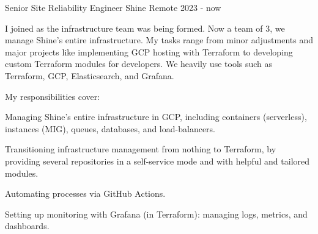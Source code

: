


\begin{cventries}

\cventry
{Senior Site Reliability Engineer} %
{Shine} %
{Remote} %
{2023 - now} %
{ %
\begin{cvitems}
\item {I joined as the infrastructure team was being formed. Now a team of 3, we manage Shine's entire infrastructure. My tasks range from minor adjustments and major projects like implementing GCP hosting with Terraform to developing custom Terraform modules for developers. We heavily use tools such as Terraform, GCP, Elasticsearch, and Grafana.}
\item {My responsibilities cover:}
\item {Managing Shine’s entire infrastructure in GCP, including containers (serverless), instances (MIG), queues, databases, and load-balancers.}
\item {Transitioning infrastructure management from nothing to Terraform, by providing several repositories in a self-service mode and with helpful and tailored modules.}
\item {Automating processes via GitHub Actions.}
\item {Setting up monitoring with Grafana (in Terraform): managing logs, metrics, and dashboards.}
\end{cvitems}
}




\end{cventries}
